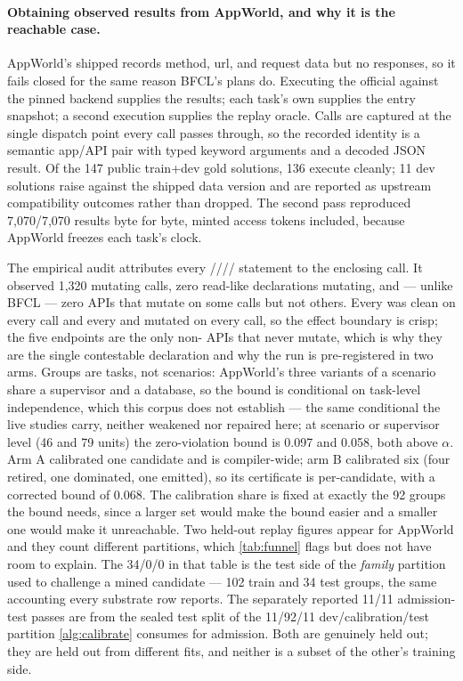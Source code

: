 \paragraph{Obtaining observed results from AppWorld, and why it is the reachable case.}
AppWorld's shipped  records method, url, and request data
but no responses, so it fails closed for the same reason BFCL's plans do.
Executing the official  against the pinned
 backend supplies the results; each task's own
 supplies the entry snapshot; a second execution supplies the
replay oracle. Calls are captured at the single dispatch point every
 call passes through, so the recorded identity is a
semantic app/API pair with typed keyword arguments and a decoded JSON result. Of
the 147 public train+dev gold solutions, 136 execute cleanly; 11 dev solutions
raise against the shipped data version and are reported as upstream
compatibility outcomes rather than dropped. The second pass reproduced
7{,}070/7{,}070 results byte for byte, minted access tokens included, because
AppWorld freezes each task's clock.

The empirical audit attributes every
///\allowbreak{}/ statement to the enclosing call. It observed 1{,}320
mutating calls, zero read-like declarations mutating, and --- unlike BFCL --- zero
APIs that mutate on some calls but not others. Every  was clean on
every call and every  and  mutated on every call, so
the effect boundary is crisp; the five  endpoints are the only
non- APIs that never mutate, which is why they are the single
contestable declaration and why the run is pre-registered in two arms. Groups
are tasks, not scenarios: AppWorld's three variants of a scenario share a
supervisor and a database, so the bound is conditional on task-level
independence, which this corpus does not establish --- the same conditional the
live studies carry, neither weakened nor repaired here; at scenario or
supervisor level (46 and 79 units) the zero-violation bound is 0.097 and
0.058, both above $\alpha$. Arm A calibrated one candidate and is
compiler-wide; arm B calibrated six (four retired, one dominated, one emitted),
so its certificate is per-candidate, with a corrected bound of 0.068. The calibration share is
fixed at exactly the 92 groups the bound needs, since a larger set would make
the bound easier and a smaller one would make it unreachable. Two held-out
replay figures appear for AppWorld and they count different partitions, which
\cref{tab:funnel} flags but does not have room to explain. The 34/0/0 in that
table is the test side of the \emph{family} partition used to challenge a mined
candidate --- 102 train and 34 test groups, the same accounting every substrate
row reports. The separately reported 11/11 admission-test passes are from the sealed test split
of the 11/92/11 dev/calibration/test partition \cref{alg:calibrate} consumes for
admission. Both are genuinely held out; they are held out from different fits,
and neither is a subset of the other's training side.

